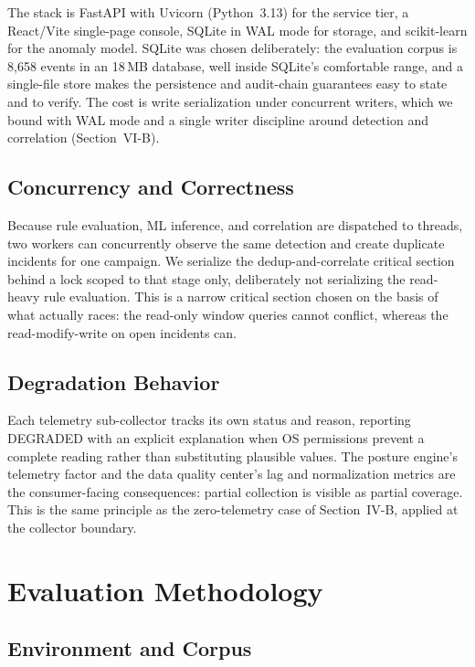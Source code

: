 \documentclass[conference]{IEEEtran}
\begin{document}
The stack is FastAPI with Uvicorn (Python~3.13) for the service tier, a
React/Vite single-page console, SQLite in WAL mode for storage, and
scikit-learn for the anomaly model. SQLite was chosen deliberately: the
evaluation corpus is 8{,}658 events in an 18\,MB database, well inside
SQLite's comfortable range, and a single-file store makes the persistence and
audit-chain guarantees easy to state and to verify. The cost is write
serialization under concurrent writers, which we bound with WAL mode and a
single writer discipline around detection and correlation (Section~VI-B).

\subsection{Concurrency and Correctness}

Because rule evaluation, ML inference, and correlation are dispatched to
threads, two workers can concurrently observe the same detection and create
duplicate incidents for one campaign. We serialize the
dedup-and-correlate critical section behind a lock scoped to that stage
only, deliberately not serializing the read-heavy rule evaluation. This is a
narrow critical section chosen on the basis of what actually races: the
read-only window queries cannot conflict, whereas the
read-modify-write on open incidents can.

\subsection{Degradation Behavior}

Each telemetry sub-collector tracks its own status and reason, reporting
DEGRADED with an explicit explanation when OS permissions prevent a complete
reading rather than substituting plausible values. The posture engine's
telemetry factor and the data quality center's lag and normalization metrics
are the consumer-facing consequences: partial collection is visible as
partial coverage. This is the same principle as the zero-telemetry case of
Section~IV-B, applied at the collector boundary.

\section{Evaluation Methodology}

\subsection{Environment and Corpus}
\end{document}
